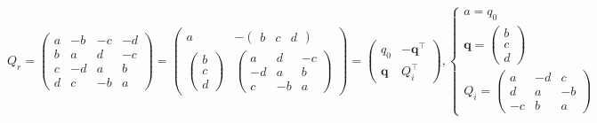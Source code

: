 \documentclass[
]{book}
\theoremstyle{definition}
\theoremstyle{definition}
\theoremstyle{definition}
\theoremstyle{definition}
\theoremstyle{remark}
\begin{document}
\[
Q_{{\scriptscriptstyle r}}=\begin{pmatrix}a & -b & -c & -d\\
b & a & d & -c\\
c & -d & a & b\\
d & c & -b & a
\end{pmatrix}=\begin{pmatrix}a & -\begin{pmatrix}b & c & d\end{pmatrix}\\
\begin{pmatrix}b\\
c\\
d
\end{pmatrix} & \begin{pmatrix}a & d & -c\\
-d & a & b\\
c & -b & a
\end{pmatrix}
\end{pmatrix}=\begin{pmatrix}q_{{\scriptscriptstyle 0}} & -\boldsymbol{q}^{\intercal}\\
\boldsymbol{q} & Q_{{\scriptscriptstyle i}}^{\intercal}
\end{pmatrix},\begin{cases}
a=q_{{\scriptscriptstyle 0}}\\
\boldsymbol{q}=\begin{pmatrix}b\\
c\\
d
\end{pmatrix}\\
Q_{{\scriptscriptstyle i}}=\begin{pmatrix}a & -d & c\\
d & a & -b\\
-c & b & a
\end{pmatrix}
\end{cases}
\]
\end{document}
